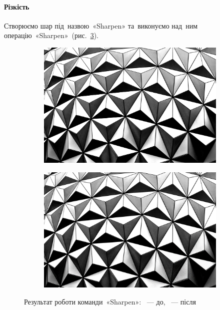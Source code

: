 \documentclass[
	a4paper,
	oneside,
	BCOR = 10mm,
	DIV = 12,
	12pt,
	headings = normal,
]{scrartcl}
\begin{document}
		\paragraph{Різкість}
			Створюємо шар під~назвою~\textenglish{«Sharpen»} та~виконуємо над~ним операцію~\textenglish{«Sharpen»}~(рис.~\ref{fig:05-sharpen}).
			\begin{figure}[!htbp]
				\centering
				\begin{subfigure}{0.5\columnwidth}
					\centering
					\includegraphics[height = 6\baselineskip]{./assets/abstract-abstract-photo-art-1070345.jpg}
					\caption{}
					\label{subfig:05-01-sharpen}
				\end{subfigure}%
				\begin{subfigure}{0.5\columnwidth}
					\centering
					\includegraphics[height = 6\baselineskip]{./assets/y03s01-multimedia-lab-01-p01-05-sharpen.jpg}
					\caption{}
					\label{subfig:05-02-sharpen}
				\end{subfigure}%
				\caption{Результат роботи команди~\textenglish{«Sharpen»}: ~— до, ~— після}
				\label{fig:05-sharpen}
			\end{figure}
\end{document}
